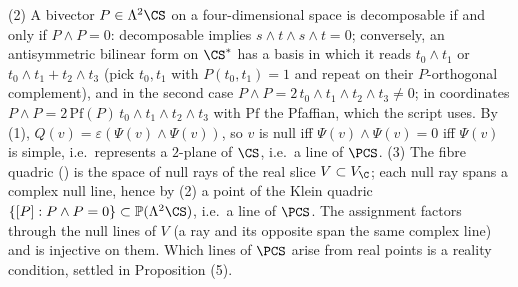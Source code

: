 (2) A bivector $P \in \Lambda^2\CS$ on a four-dimensional space is decomposable if and only if $P \wedge P = 0$: decomposable implies $s\wedge t\wedge s\wedge t = 0$; conversely, an antisymmetric bilinear form on $\CS^*$ has a basis in which it reads $t_0\wedge t_1$ or $t_0\wedge t_1 + t_2\wedge t_3$ (pick $t_0, t_1$ with $P(t_0,t_1) = 1$ and repeat on their $P$-orthogonal complement), and in the second case $P\wedge P = 2\,t_0\wedge t_1\wedge t_2\wedge t_3 \neq 0$; in coordinates $P\wedge P = 2\,\mathrm{Pf}(P)\, t_0\wedge t_1\wedge t_2 \wedge t_3$ with $\mathrm{Pf}$ the Pfaffian, which the script uses. By (1), $Q(v) = \varepsilon(\Psi(v)\wedge\Psi(v))$, so $v$ is null iff $\Psi(v)\wedge\Psi(v) = 0$ iff $\Psi(v)$ is simple, i.e.\ represents a $2$-plane of $\CS$, i.e.\ a line of $\PCS$.
(3) The fibre quadric () is the space of null rays of the real slice $V \subset V_\C$; each null ray spans a complex null line, hence by (2) a point of the Klein quadric $\{[P] : P\wedge P = 0\} \subset \mathbb{P}(\Lambda^2\CS)$, i.e.\ a line of $\PCS$. The assignment factors through the null lines of $V$ (a ray and its opposite span the same complex line) and is injective on them. Which lines of $\PCS$ arise from real points is a reality condition, settled in Proposition (5).
